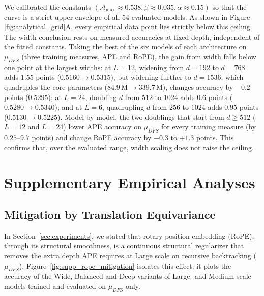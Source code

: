 We calibrated the constants $(\mathcal{A}_{\max} \approx 0.538, \beta \approx 0.035, \alpha \approx 0.15)$ so that the curve is a strict upper envelope of all 54 evaluated models. As shown in Figure \ref{fig:analytical_grid}A, every empirical data point lies strictly below this ceiling. The width conclusion rests on measured accuracies at fixed depth, independent of the fitted constants. Taking the best of the six models of each architecture on $\mu_{DFS}$ (three training measures, APE and RoPE), the gain from width falls below one point at the largest widths: at $L=12$, widening from $d=192$ to $d=768$ adds $1.55$ points ($0.5160\to0.5315$), but widening further to $d=1536$, which quadruples the core parameters ($84.9\,\mathrm{M}\to339.7\,\mathrm{M}$), changes accuracy by $-0.2$ points ($0.5295$); at $L=24$, doubling $d$ from $512$ to $1024$ adds $0.6$ points ($0.5280\to0.5340$); and at $L=6$, quadrupling $d$ from $256$ to $1024$ adds $0.95$ points ($0.5130\to0.5225$). Model by model, the two doublings that start from $d\ge512$ ($L=12$ and $L=24$) lower APE accuracy on $\mu_{DFS}$ for every training measure (by $0.25$--$9.7$ points) and change RoPE accuracy by $-0.3$ to $+1.3$ points. This confirms that, over the evaluated range, width scaling does not raise the ceiling.

\section{Supplementary Empirical Analyses}
\label{app:Supp Fig}

\subsection{Mitigation by Translation Equivariance}

In Section~\ref{sec:experiments}, we stated that rotary position embedding (RoPE), through its structural smoothness, is a continuous structural regularizer that removes the extra depth APE requires at Large scale on recursive backtracking ($\mu_{DFS}$). Figure~\ref{fig:supp_rope_mitigation} isolates this effect: it plots the accuracy of the Wide, Balanced and Deep variants of Large- and Medium-scale models trained and evaluated on $\mu_{DFS}$ only. 

